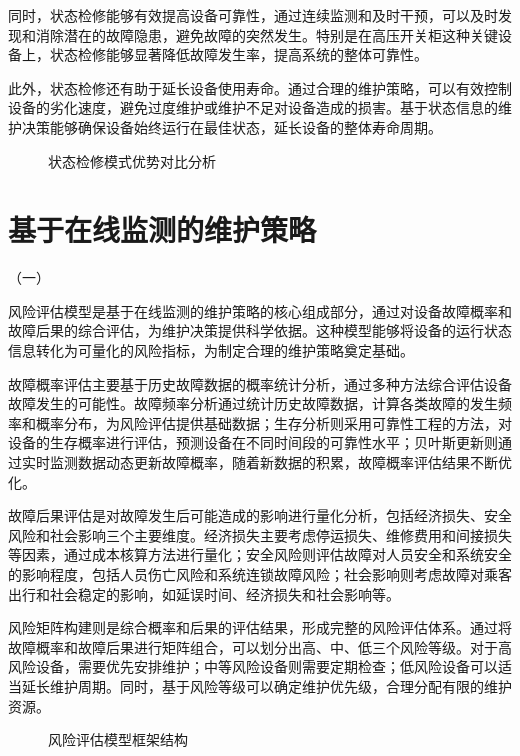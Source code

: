 同时，状态检修能够有效提高设备可靠性，通过连续监测和及时干预，可以及时发现和消除潜在的故障隐患，避免故障的突然发生。特别是在高压开关柜这种关键设备上，状态检修能够显著降低故障发生率，提高系统的整体可靠性。

此外，状态检修还有助于延长设备使用寿命。通过合理的维护策略，可以有效控制设备的劣化速度，避免过度维护或维护不足对设备造成的损害。基于状态信息的维护决策能够确保设备始终运行在最佳状态，延长设备的整体寿命周期。

\begin{figure}[h]
\centering
\caption{状态检修模式优势对比分析}
\label{fig:cbm_advantages}
\end{figure}

\section{基于在线监测的维护策略}

（一）

风险评估模型是基于在线监测的维护策略的核心组成部分，通过对设备故障概率和故障后果的综合评估，为维护决策提供科学依据。这种模型能够将设备的运行状态信息转化为可量化的风险指标，为制定合理的维护策略奠定基础。

故障概率评估主要基于历史故障数据的概率统计分析，通过多种方法综合评估设备故障发生的可能性。故障频率分析通过统计历史故障数据，计算各类故障的发生频率和概率分布，为风险评估提供基础数据；生存分析则采用可靠性工程的方法，对设备的生存概率进行评估，预测设备在不同时间段的可靠性水平；贝叶斯更新则通过实时监测数据动态更新故障概率，随着新数据的积累，故障概率评估结果不断优化。

故障后果评估是对故障发生后可能造成的影响进行量化分析，包括经济损失、安全风险和社会影响三个主要维度。经济损失主要考虑停运损失、维修费用和间接损失等因素，通过成本核算方法进行量化；安全风险则评估故障对人员安全和系统安全的影响程度，包括人员伤亡风险和系统连锁故障风险；社会影响则考虑故障对乘客出行和社会稳定的影响，如延误时间、经济损失和社会影响等。

风险矩阵构建则是综合概率和后果的评估结果，形成完整的风险评估体系。通过将故障概率和故障后果进行矩阵组合，可以划分出高、中、低三个风险等级。对于高风险设备，需要优先安排维护；中等风险设备则需要定期检查；低风险设备可以适当延长维护周期。同时，基于风险等级可以确定维护优先级，合理分配有限的维护资源。

\begin{figure}[h]
\centering
\caption{风险评估模型框架结构}
\label{fig:risk_assessment_model}
\end{figure}

